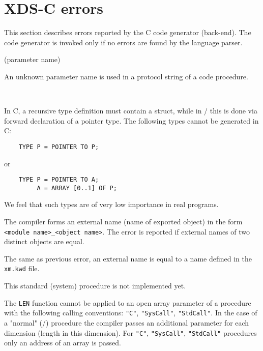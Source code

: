 \ifgenc
\section{XDS-C errors}

This section describes errors reported by the C code generator (back-end).
The code generator is invoked only if no errors are found by the
language parser.

(parameter name)

An unknown parameter name is used in a protocol string of a code
procedure.

 \ifonline\else\\\fi
{}

In C, a recursive type definition must contain a struct, while in
\mt{}/\ot{} this is done via forward declaration of a pointer
type. The following types cannot be generated in C:

\verb'    TYPE P = POINTER TO P;'

or

\verb'    TYPE P = POINTER TO A;'\\
\verb'         A = ARRAY [0..1] OF P;'

We feel that such types are of very low importance in real programs.


The compiler forms an external name (name of exported object)
in the form \verb'<module name>_<object name>'. The error is reported
if external names of two distinct objects are equal.


The same as previous error, an external name is equal to a name
defined in the \verb'xm.kwd' file.


This standard (system) procedure is not implemented yet.


The \verb'LEN' function cannot be applied to an open array parameter of a
procedure with the following calling conventions: \verb'"C"', \verb'"SysCall"',
\verb'"StdCall"'. In the case of a "normal" (\ot{}/\mt{}) procedure
the compiler passes an additional parameter for each dimension (length
in this dimension). For \verb'"C"', \verb'"SysCall"', \verb'"StdCall"' procedures only
an address of an array is passed.

